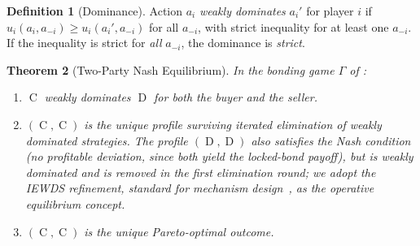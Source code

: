 \documentclass[11pt,a4paper]{article}
\newtheorem{theorem}{Theorem}[section]
\theoremstyle{definition}
\newtheorem{definition}[theorem]{Definition}
\theoremstyle{remark}
\DeclareMathOperator{\Coop}{C}
\DeclareMathOperator{\Def}{D}
\begin{document}
\begin{definition}[Dominance]
\label{def:dominance}
Action $a_i$ \emph{weakly dominates} $a_i'$ for player $i$ if
$u_i(a_i, a_{-i}) \geq u_i(a_i', a_{-i})$ for all $a_{-i}$, with
strict inequality for at least one $a_{-i}$. If the inequality is
strict for \emph{all} $a_{-i}$, the dominance is \emph{strict}.
\end{definition}

\begin{theorem}[Two-Party Nash Equilibrium]
\label{thm:two-party-nash}
In the bonding game $\Gamma$ of :
\begin{enumerate}[label=(\alph*)]
  \item $\Coop$ weakly dominates $\Def$ for both the buyer and
    the seller.
  \item $(\Coop, \Coop)$ is the unique profile surviving iterated
    elimination of weakly dominated strategies. The profile
    $(\Def, \Def)$ also satisfies the Nash condition (no
    \emph{profitable} deviation, since both yield the locked-bond
    payoff), but is weakly dominated and is removed in the first
    elimination round; we adopt the IEWDS refinement, standard for
    mechanism design~\citep{myerson1979}, as the operative
    equilibrium concept.
  \item $(\Coop, \Coop)$ is the unique Pareto-optimal outcome.
\end{enumerate}
\end{theorem}
\end{document}
